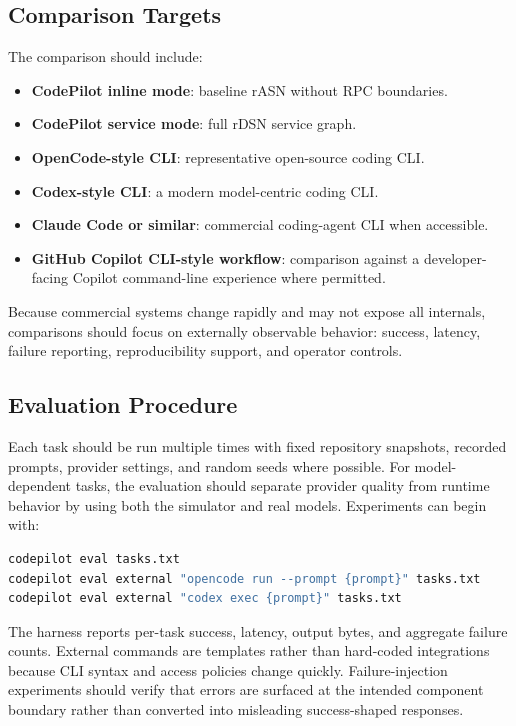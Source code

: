 \documentclass[manuscript,screen,review]{acmart}
\newcommand{\rasn}{rASN\xspace}
\newcommand{\rdsn}{rDSN\xspace}
\newcommand{\codepilot}{CodePilot\xspace}
\begin{document}
\subsection{Comparison Targets}

The comparison should include:

\begin{itemize}
  \item \textbf{\codepilot inline mode}: baseline \rasn without RPC boundaries.
  \item \textbf{\codepilot service mode}: full \rdsn service graph.
  \item \textbf{OpenCode-style CLI}: representative open-source coding CLI.
  \item \textbf{Codex-style CLI}: a modern model-centric coding CLI.
  \item \textbf{Claude Code or similar}: commercial coding-agent CLI when
  accessible.
  \item \textbf{GitHub Copilot CLI-style workflow}: comparison against a
  developer-facing Copilot command-line experience where permitted.
\end{itemize}

Because commercial systems change rapidly and may not expose all internals,
comparisons should focus on externally observable behavior: success, latency,
failure reporting, reproducibility support, and operator controls.

\subsection{Evaluation Procedure}

Each task should be run multiple times with fixed repository snapshots,
recorded prompts, provider settings, and random seeds where possible. For
model-dependent tasks, the evaluation should separate provider quality from
runtime behavior by using both the simulator and real models. Experiments can
begin with:

\begin{lstlisting}[language=bash]
codepilot eval tasks.txt
codepilot eval external "opencode run --prompt {prompt}" tasks.txt
codepilot eval external "codex exec {prompt}" tasks.txt
\end{lstlisting}

The harness reports per-task success, latency, output bytes, and aggregate
failure counts. External commands are templates rather than hard-coded
integrations because CLI syntax and access policies change quickly.
Failure-injection
experiments should verify that errors are surfaced at the intended component
boundary rather than converted into misleading success-shaped responses.
\end{document}
